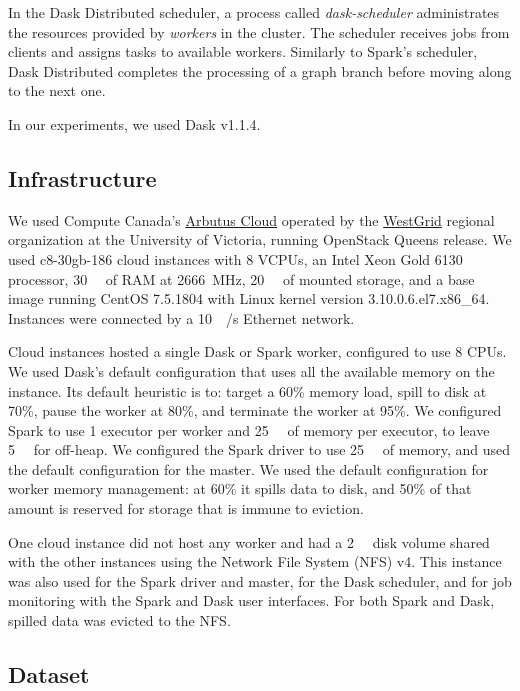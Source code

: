 \documentclass[conference]{IEEEtran}
\begin{document}
In the Dask Distributed scheduler, a process called \textit{dask-scheduler}
administrates the resources provided by \textit{workers} in the cluster. The
scheduler receives jobs from clients and assigns tasks to available workers.
Similarly to Spark's scheduler, Dask Distributed completes the processing of a
graph branch before moving along to the next one. 

In our experiments, we used Dask v1.1.4.


\subsection{Infrastructure}

 We used Compute Canada's
 \href{https://docs.computecanada.ca/wiki/Cloud\_resources}{Arbutus Cloud} operated by
 the \href{https://www.westgrid.ca}{WestGrid} regional organization at the University
 of Victoria, running OpenStack Queens release. We used c8-30gb-186 cloud
 instances with 8 VCPUs, an Intel Xeon Gold 6130 processor, \SI{30}{\giga\byte} of
 RAM at \SI{2666}{\mega\hertz}, \SI{20}{\giga\byte} of mounted storage, and a base
 image running CentOS 7.5.1804 with Linux kernel version
 3.10.0.6.el7.x86\_64. Instances were connected by a
 \SI{10}{\giga\bit/\second} Ethernet network.
 
 Cloud instances hosted a single Dask or Spark worker, configured to use 8 CPUs. We
 used Dask's default configuration that uses all the available memory on the
 instance. Its default heuristic is to: target a 60\% memory load, spill to disk at
 70\%, pause the worker at 80\%, and terminate the worker at 95\%. We configured
 Spark to use 1 executor per worker and \SI{25}{\giga\byte} of memory per executor, to leave \SI{5}{\giga\byte}
 for off-heap. We configured the Spark driver to use \SI{25}{\giga\byte} of memory, and used the
 default configuration for the master. We used the default configuration for worker
 memory management: at 60\% it spills data to disk, and 50\% of that amount is
 reserved for storage that is immune to eviction.
 
 One cloud instance did not host any worker and had a \SI{2}{\tera\byte} disk volume
 shared with the other instances using the Network File System (NFS) v4.
 This instance was also used for the Spark driver and master, for the
 Dask scheduler, and for job monitoring with the Spark and Dask user
 interfaces. For both Spark and Dask, spilled data was evicted to the NFS.

\subsection{Dataset}
\end{document}
